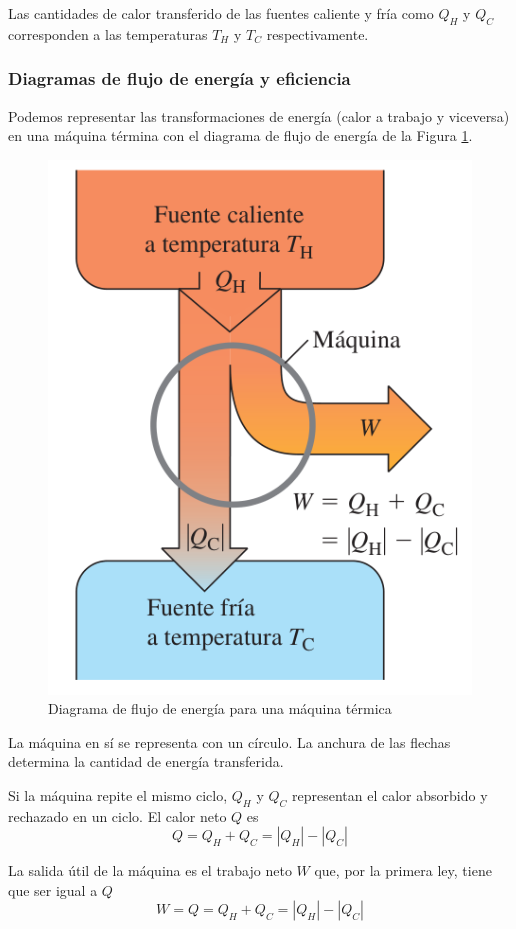 \documentclass[12pt]{article}
\begin{document}
  Las cantidades de calor transferido de las fuentes caliente y fría como $ Q_{H} $ y $ Q_{C} $ corresponden a las temperaturas $ T_{H} $ y $ T_{C} $ respectivamente.

  \subsubsection{Diagramas de flujo de energía y eficiencia}
  Podemos representar las transformaciones de energía (calor a trabajo y viceversa) en una máquina términa con el diagrama de flujo de energía de la Figura \ref{fig:diag-flujo}. 

  \begin{figure}[H]
    \centering
    \includegraphics[width=0.5\linewidth]{imagenes/diagrama-de-flujo.png}
    \caption{Diagrama de flujo de energía para una máquina térmica}
    \label{fig:diag-flujo}
  \end{figure}
  
  La máquina en sí se representa con un círculo. La anchura de las flechas determina la cantidad de energía transferida.
  
  Si la máquina repite el mismo ciclo, $ Q_{H} $ y $ Q_{C} $ representan el calor absorbido y rechazado en un ciclo. El calor neto $ Q $ es 
  \[
    Q = Q_{H} + Q_{C} = \left|Q_{H}\right| - \left|Q_{C}\right|
  \]

  La salida útil de la máquina es el trabajo neto $ W $ que, por la primera ley, tiene que ser igual a $ Q $
  \[
    W = Q = Q_{H} + Q_{C} = \left|Q_{H}\right| - \left|Q_{C}\right|
  \]
\end{document}
